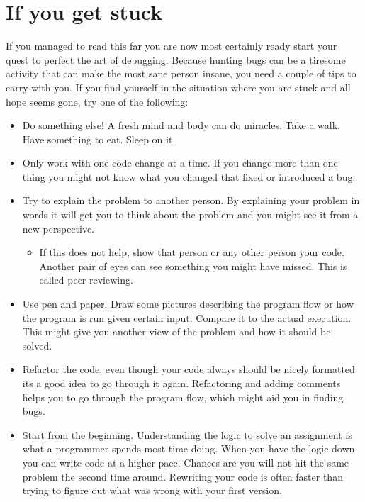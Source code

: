 \documentclass[11pt,a4paper,twoside]{article}
\begin{document}
\section{If you get stuck}

If you managed to read this far you are now most certainly ready start your
quest to perfect the art of debugging. Because hunting bugs can be a tiresome
activity that can make the most sane person insane, you need a couple of tips
to carry with you. If you find yourself in the situation where you are stuck
and all hope seems gone, try one of the following: 

\begin{itemize} 
    \item 
        Do something else! A fresh mind and body can do miracles. Take a walk.
        Have something to eat. Sleep on it.
    \item 
        Only work with one code change at a time. If you change more than one
        thing you might not know what you changed that fixed or introduced a
        bug.
    \item 
        Try to explain the problem to another person. By explaining your
        problem in words it will get you to think about the problem and you
        might see it from a new perspective.  
    \begin{itemize}
          \item 
              If this does not help, show that person or any other person your
              code. Another pair of eyes can see something you might have
              missed. This is called peer-reviewing.
    \end{itemize}
    \item 
        Use pen and paper. Draw some pictures describing the program flow or
        how the program is run given certain input. Compare it to the actual
        execution. This might give you another view of the problem and how it
        should be solved.

    \item 
        Refactor the code, even though your code always should be nicely
        formatted its a good idea to go through it again. Refactoring and
        adding comments helps you to go through the program flow, which might
        aid you in finding bugs.
    \item 
        Start from the beginning. Understanding the logic to solve an
        assignment is what a programmer spends most time doing. When you have
        the logic down you can write code at a higher pace. Chances are you
        will not hit the same problem the second time around. Rewriting your
        code is often faster than trying to figure out what was wrong with your
        first version.
\end{itemize}
\end{document}
